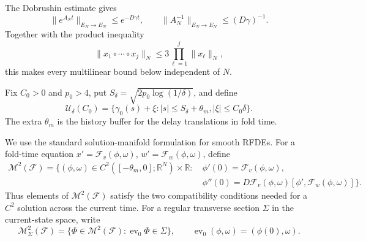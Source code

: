 The Dobrushin estimate gives
\begin{equation}
 \|e^{A_Nt}\|_{E_N\to E_N}\le e^{-D\gamma t},
 \qquad
 \|A_N^{-1}\|_{E_N\to E_N}\le(D\gamma)^{-1}.
 \label{eq:fold-poisson-bound}
\end{equation}
Together with the product inequality
\begin{equation}
 \|x_1\circ\cdots\circ x_j\|_N
 \le3\prod_{\ell=1}^j\|x_\ell\|_N,
 \label{eq:fold-product-bound}
\end{equation}
this makes every multilinear bound below independent of \(N\).

Fix \(C_0>0\) and \(p_0>4\), put
\(S_\delta=\sqrt{2p_0\log(1/\delta)}\), and define
\begin{equation*}
 \mathcal U_\delta(C_0)
 =\{\gamma_0(s)+\xi:|s|\le S_\delta+\theta_m,
                         |\xi|\le C_0\delta\}.
\end{equation*}
The extra \(\theta_m\) is the history buffer for the delay translations in
fold time.

We use the standard solution-manifold formulation for smooth RFDEs.  For a
fold-time equation
\(x'=\mathcal F_v(\phi,\omega)\),
\(w'=\mathcal F_w(\phi,\omega)\), define
\begin{equation}
 \begin{split}
 \mathcal M^2(\mathcal F)=\{(\phi,\omega)\in
 C^2([-\theta_m,0];\mathbb R^N)\times\mathbb R:\ {}
 &\phi'(0)=\mathcal F_v(\phi,\omega),\\
 &\phi''(0)=D\mathcal F_v(\phi,\omega)
       [\phi',\mathcal F_w(\phi,\omega)]\}.
 \end{split}                                      \label{eq:C2-solution-manifold}
\end{equation}
Thus elements of \(\mathcal M^2(\mathcal F)\) satisfy the two compatibility
conditions needed for a \(C^2\) solution across the current time.  For a
regular transverse section \(\Sigma\) in the current-state space, write
\begin{equation}
 \mathcal M_\Sigma^2(\mathcal F)
 =\{\Phi\in\mathcal M^2(\mathcal F):
       \operatorname{ev}_0\Phi\in\Sigma\},
 \qquad \operatorname{ev}_0(\phi,\omega)=(\phi(0),\omega).
 \label{eq:C2-solution-manifold-section}
\end{equation}

